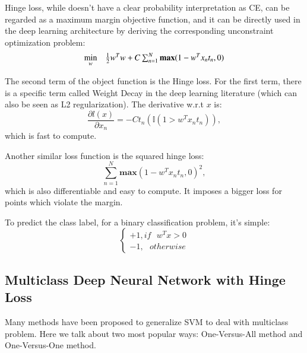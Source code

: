 \documentclass{article} %
\begin{document}
Hinge loss, while doesn't have a clear probability interpretation as CE, can be regarded as a maximum margin objective function, and it can be directly used in the deep learning architecture by deriving the corresponding unconstraint optimization problem:
\begin{equation}
\begin{array}{rrclcl}
\displaystyle \min_{w} & \multicolumn{3}{l}{ \frac{1}{2}w^{T}w+C\sum_{n=1}^{N}\textbf{max}(1-w^{T}x_{n}t_{n},0)}\\

\end{array}
\end{equation}

The second term of the object function is the Hinge loss. For the first term, there is a specific term called Weight Decay in the deep learning literature (which can also be seen as L2 regularization). The derivative w.r.t $x$ is:
\begin{equation}
\frac{\partial l(x)}{\partial x_{n}} = -Ct_{n}(\mathbb{I}(1>w^{T}x_{n}t_{n})),
\end{equation}
which is fast to compute.


Another similar loss function is the squared hinge loss:
\begin{equation}
\sum_{n=1}^{N}\textbf{max}(1-w^{T}x_{n}t_{n},0)^{2},
\end{equation}
which is also differentiable and easy to compute. It imposes a bigger loss for points which violate the margin.


To predict the class label, for a binary classification problem, it's simple:
\begin{equation}
\left\{\begin{matrix}
+1, if \, \, \, \, w^{T}x > 0\\
-1, \, \, \, \, otherwise 

\end{matrix}\right.
\end{equation}

\subsection{Multiclass Deep Neural Network with Hinge Loss}
Many methods have been proposed to generalize SVM to deal with multiclass problem. Here we talk about two most popular ways: One-Versus-All method and One-Versus-One method.
\end{document}
